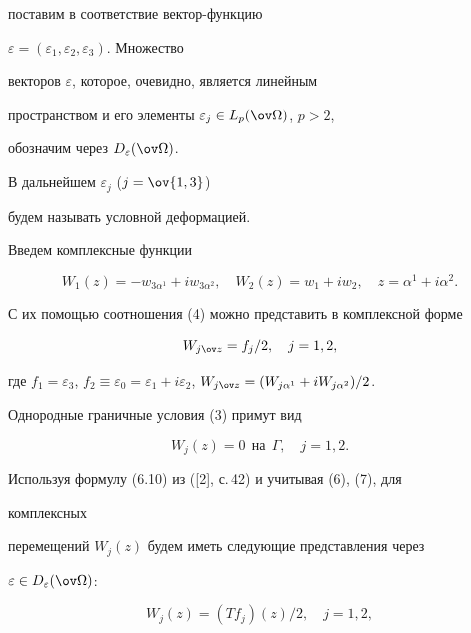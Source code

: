 поставим в соответствие вектор-функцию 


$\varepsilon=(\varepsilon_1,\varepsilon_2,\varepsilon_3)$. Множество 


векторов $\varepsilon$, которое, очевидно, является линейным 


пространством и его элементы $\varepsilon_j\in L_p(\ov \Omega)$, $p>2$, 


обозначим через $D_\varepsilon(\ov\Omega)$. 


В дальнейшем $\varepsilon_j$ ($j=\ov{1,3}$) 


будем называть условной деформацией. 


 


Введем комплексные функции 


\begin{equation} 


W_1(z)=-w_{3\alpha^1}+i w_{3\alpha^2},\quad 


W_2(z)=w_1+i w_2,\quad z=\alpha^1+i\alpha^2. 


\end{equation} 


С их помощью соотношения (4) можно представить в комплексной форме 


\begin{equation} 


W_{j\ov z}=f_j/2,\quad j=1,2, 


\end{equation} 


где $f_1=\varepsilon_3$, $f_2\equiv\varepsilon_0= 


\varepsilon_1+i\varepsilon_2$, $W_{j\ov z}=(W_{j\alpha^1}+i 


W_{j\alpha^2})/2$. 


Однородные граничные условия (3) примут вид 


\begin{equation} 


W_j(z)=0\ \ \text{на}\ \ \Gamma,\quad j=1,2. 


\end{equation} 


Используя формулу (6.10) из ([2], с.\,42) и учитывая (6), (7), для 


комплексных 


перемещений $W_j(z)$ будем иметь следующие представления через 


$\varepsilon\in D_\varepsilon(\ov\Omega)$: 


\begin{equation} 


W_j(z)=(T f_j)(z)/2,\quad j=1,2, 


\end{equation} 


